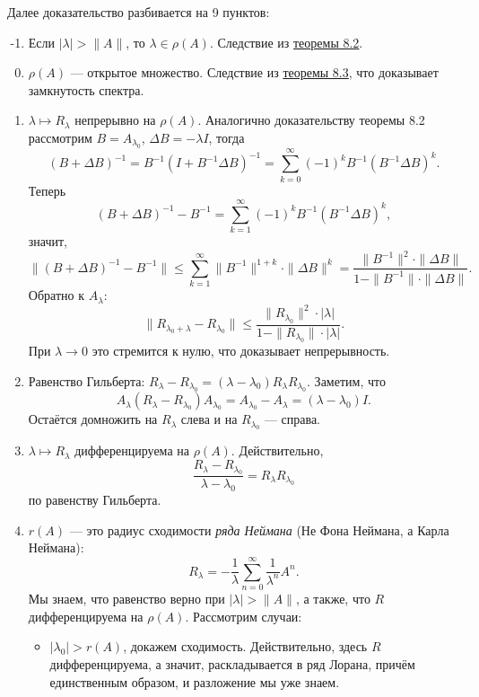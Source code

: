 Далее доказательство разбивается на 9 пунктов:
\begin{enumerate}
    \setcounter{enumi}{-2}
    \item Если $|\lambda| > \|A\|$, то $\lambda \in \rho(A)$.
        Следствие из \hyperref[th:8-2]{теоремы 8.2}.

    \item $\rho(A)$ --- открытое множество.
        Следствие из \hyperref[th:8-2]{теоремы 8.3}, что доказывает замкнутость спектра.

    \item $\lambda \mapsto R_\lambda$ непрерывно на $\rho(A)$.
        Аналогично доказательству теоремы 8.2 рассмотрим $B = A_{\lambda_0}$, $\Delta B = -\lambda I$, тогда
        \[
            (B + \Delta B)^{-1} = B^{-1}(I + B^{-1} \Delta B)^{-1} = \sum_{k=0}^{\infty} (-1)^k B^{-1} (B^{-1} \Delta B)^k.
        \]
        Теперь
        \[
            (B + \Delta B)^{-1} - B^{-1} = \sum_{k=1}^{\infty} (-1)^k B^{-1} (B^{-1} \Delta B)^k,
        \]
        значит,
        \[
            \|(B + \Delta B)^{-1} - B^{-1}\| \le \sum_{k=1}^{\infty} \|B^{-1}\|^{1 + k} \cdot \|\Delta B\|^k = \frac{\|B^{-1}\|^2 \cdot \|\Delta B\|}{1 - \|B^{-1}\| \cdot \|\Delta B\|}.
        \]
        Обратно к $A_\lambda$:
        \[
            \|R_{\lambda_0 + \lambda} - R_{\lambda_0}\| \le \frac{\|R_{\lambda_0}\|^2 \cdot |\lambda|}{1 - \|R_{\lambda_0}\| \cdot |\lambda|}.
        \]
        При $\lambda \to 0$ это стремится к нулю, что доказывает непрерывность.

    \item Равенство Гильберта: $R_\lambda - R_{\lambda_0} = (\lambda - \lambda_0) R_\lambda R_{\lambda_0}$.
        Заметим, что
        \[
            A_{\lambda} (R_\lambda - R_{\lambda_0}) A_{\lambda_0} = A_{\lambda_0} - A_{\lambda} = (\lambda - \lambda_0) I.
        \]
        Остаётся домножить на $R_\lambda$ слева и на $R_{\lambda_0}$ --- справа.

    \item $\lambda \mapsto R_\lambda$ дифференцируема на $\rho(A)$.
        Действительно,
        \[
            \frac{R_{\lambda} - R_{\lambda_0}}{\lambda - \lambda_0} = R_{\lambda} R_{\lambda_0}
        \]
        по равенству Гильберта.

    \item $r(A)$ --- это радиус сходимости \textit{ряда Неймана} (Не Фона Неймана, а Карла Неймана):
        \[
            R_{\lambda} = -\frac{1}{\lambda} \sum_{n=0}^\infty \frac{1}{\lambda^n} A^n.
        \]
        Мы знаем, что равенство верно при $|\lambda| > \|A\|$, а также, что $R$ дифференцируема на $\rho(A)$.
        Рассмотрим случаи:
        \begin{itemize}
            \item $|\lambda_0| > r(A)$, докажем сходимость.
                Действительно, здесь $R$ дифференцируема, а значит, раскладывается в ряд Лорана, причём единственным образом, и разложение мы уже знаем.


\end{itemize}
\end{enumerate}
